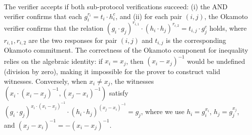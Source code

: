 The verifier accepts if both sub-protocol verifications succeed: (i) the AND verifier confirms that each $g_i^{r_i} = t_i \cdot h_i^c$, and (ii) for each pair $(i, j)$, the Okamoto verifier confirms that the relation $(g_i \cdot g_j)^{r_{i,1}} \cdot (h_i \cdot h_j)^{r_{i,2}} = t_{i,j} \cdot g_j^c$ holds, where $r_{i,1}, r_{i,2}$ are the two responses for pair $(i,j)$ and $t_{i,j}$ is the corresponding Okamoto commitment. The correctness of the Okamoto component for inequality relies on the algebraic identity: if $x_i = x_j$, then $(x_i - x_j)^{-1}$ would be undefined (division by zero), making it impossible for the prover to construct valid witnesses. Conversely, when $x_i \neq x_j$, the witnesses $\left(x_i \cdot (x_i - x_j)^{-1}, (x_j - x_i)^{-1}\right)$ satisfy $(g_i \cdot g_j)^{x_i \cdot (x_i - x_j)^{-1}} \cdot (h_i \cdot h_j)^{(x_j - x_i)^{-1}} = g_j$, where we use $h_i = g_i^{x_i}$, $h_j = g_j^{x_j}$, and $(x_j - x_i)^{-1} = -(x_i - x_j)^{-1}$.

